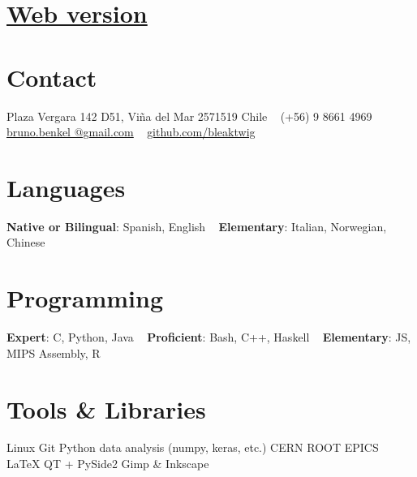 \documentclass[a4paper]{cv-style}
\begin{document}
\lastupdated

\begin{aside}
    \section{\href{https://bleaktwig.github.io/cv/}{Web version}}
    \section{Contact}
        Plaza Vergara 142 D51,
        Vi\~na del Mar 2571519
        Chile
        ~
        (+56) 9 8661 4969
        ~
        \href{mailto:bruno.benkel@gmail.com}{bruno.benkel
        @gmail.com}
        ~
        \href{https://github.com/bleaktwig}{github.com/bleaktwig}
    \section{Languages}
        \textbf{Native or Bilingual}:
        Spanish, English
        ~
        \textbf{Elementary}:
        Italian, Norwegian, Chinese
    \section{Programming}
        \textbf{Expert}:
        C, Python, Java
        ~
        \textbf{Proficient}:
        Bash, C++, Haskell
        ~
        \textbf{Elementary}:
        JS, MIPS Assembly, R
    \section{Tools \& Libraries}
        Linux
        Git
        Python data analysis (numpy, keras, etc.)
        CERN ROOT
        EPICS
        \LaTeX{}
        QT + PySide2
        Gimp \& Inkscape
\end{aside}

\end{document}
